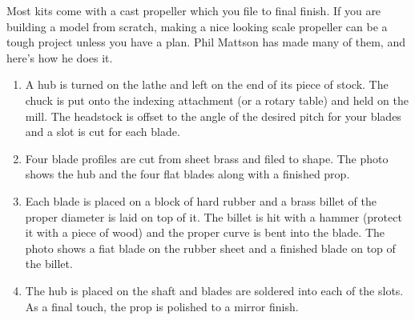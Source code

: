 \secup

\secup


\secdown


Most kits come with a cast propeller which you file to final finish. If you are
building a model from scratch, making a nice looking scale propeller can be a
tough project unless you have a plan. Phil Mattson has made many of them, and
here's how he does it.

\begin{enumerate}
  \item 
A hub is turned on the lathe and left on the end of its piece of stock. The
chuck is put onto the indexing attachment (or a rotary table) and held on the
mill. The headstock is offset to the angle of the desired pitch for your blades
and a slot is cut for each blade.
  \item 
Four blade profiles are cut from sheet brass and filed to shape. The photo shows
the hub and the four flat blades along with a finished prop.
  \item 
Each blade is placed on a block of hard rubber and a brass billet of the proper
diameter is laid on top of it. The billet is hit with a hammer (protect it with
a piece of wood) and the proper curve is bent into the blade. The photo shows a
fiat blade on the rubber sheet and a finished blade on top of the billet.
  \item 
The hub is placed on the shaft and blades are soldered into each of the slots.
As a final touch, the prop is polished to a mirror finish.
\end{enumerate}

\secup
